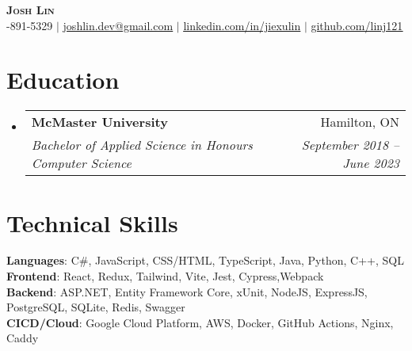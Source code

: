 \documentclass[letterpaper,11pt]{article}
\makeatletter
\newcommand{\resumeSubheading}[4]{
  \vspace{-2pt}\item
    \begin{tabular*}{0.97\textwidth}[t]{l@{\extracolsep{\fill}}r}
      \textbf{#1} & #2 \\
      \textit{\small#3} & \textit{\small #4} \\
    \end{tabular*}\vspace{-7pt}
}
\newcommand{\resumeSubHeadingListStart}{\begin{itemize}[leftmargin=0.15in, label={}]}
\newcommand{\resumeSubHeadingListEnd}{\end{itemize}}
\makeatother
\begin{document}

\begin{center}
    \textbf{\Huge \scshape Josh Lin} \\ \vspace{7pt}
    \small \faPhone \thinspace {}-891-5329
    $|$ \faEnvelope \thinspace \thinspace \href{mailto:joshlin.dev@gmail.com}{\underline{joshlin.dev@gmail.com}}
    $|$ \faLinkedin \thinspace \thinspace \href{https://linkedin.com/in/jiexulin}{\underline{linkedin.com/in/jiexulin}}
    $|$ \faGithub \thinspace \thinspace \href{https://github.com/linj121}{\underline{github.com/linj121}}
\end{center}


\section{Education}
  \resumeSubHeadingListStart
    \resumeSubheading
      {McMaster University}{Hamilton, ON}
      {Bachelor of Applied Science in Honours Computer Science}{September 2018 -- June 2023}
  \resumeSubHeadingListEnd

%

\section{Technical Skills}
 \begin{itemize}[leftmargin=0.15in, label={}]
    \small{\item{
      \textbf{Languages}{: C\#, JavaScript, CSS/HTML, TypeScript, Java, Python, C++, SQL} \\
      \textbf{Frontend}{: React, Redux, Tailwind, Vite, Jest, Cypress,Webpack } \\
      \textbf{Backend}{: ASP.NET, Entity Framework Core, xUnit, NodeJS, ExpressJS, PostgreSQL, SQLite, Redis, Swagger } \\
      \textbf{CICD/Cloud}{: Google Cloud Platform, AWS, Docker, GitHub Actions, Nginx, Caddy } \\
     }}
 \end{itemize}
\end{document}
